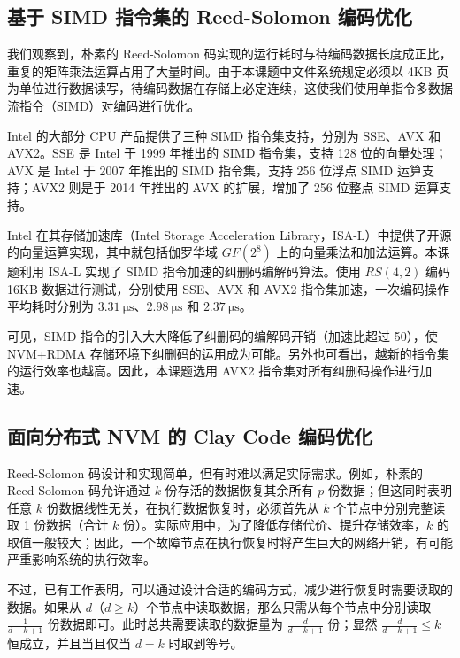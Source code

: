 \subsection{基于 SIMD 指令集的 Reed-Solomon 编码优化}
\label{subsec:ch3_rs_simd}

我们观察到，朴素的 Reed-Solomon 码实现的运行耗时与待编码数据长度成正比，重复的矩阵乘法运算占用了大量时间。由于本课题中文件系统规定必须以 4KB 页为单位进行数据读写，待编码数据在存储上必定连续，这使我们使用单指令多数据流指令（SIMD）对编码进行优化。

Intel 的大部分 CPU 产品提供了三种 SIMD 指令集支持，分别为 SSE、AVX 和 AVX2。SSE 是 Intel 于 1999 年推出的 SIMD 指令集，支持 128 位的向量处理；AVX 是 Intel 于 2007 年推出的 SIMD 指令集，支持 256 位浮点 SIMD 运算支持；AVX2 则是于 2014 年推出的 AVX 的扩展，增加了 256 位整点 SIMD 运算支持。

Intel 在其存储加速库（Intel Storage Acceleration Library，ISA-L）中提供了开源的向量运算实现，其中就包括伽罗华域 $GF(2^8)$ 上的向量乘法和加法运算。本课题利用 ISA-L 实现了 SIMD 指令加速的纠删码编解码算法。使用 $RS(4, 2)$ 编码 16KB 数据进行测试，分别使用 SSE、AVX 和 AVX2 指令集加速，一次编码操作平均耗时分别为 $\SI{3.31}{\us}$、$\SI{2.98}{\us}$ 和 $\SI{2.37}{\us}$。

可见，SIMD 指令的引入大大降低了纠删码的编解码开销（加速比超过 50），使 NVM+RDMA 存储环境下纠删码的运用成为可能。另外也可看出，越新的指令集的运行效率也越高。因此，本课题选用 AVX2 指令集对所有纠删码操作进行加速。

\subsection{面向分布式 NVM 的 Clay Code 编码优化}
\label{subsec:ch3_claycode}

Reed-Solomon 码设计和实现简单，但有时难以满足实际需求。例如，朴素的 Reed-Solomon 码允许通过 $k$ 份存活的数据恢复其余所有 $p$ 份数据；但这同时表明任意 $k$ 份数据线性无关，在执行数据恢复时，必须首先从 $k$ 个节点中分别完整读取 1 份数据（合计 $k$ 份）。实际应用中，为了降低存储代价、提升存储效率，$k$ 的取值一般较大；因此，一个故障节点在执行恢复时将产生巨大的网络开销，有可能严重影响系统的执行效率。

不过，已有工作\cite{dimakis2010}表明，可以通过设计合适的编码方式，减少进行恢复时需要读取的数据。如果从 $d$（$d \geq k$）个节点中读取数据，那么只需从每个节点中分别读取 $\frac{1}{d - k + 1}$ 份数据即可。此时总共需要读取的数据量为 $\frac{d}{d - k + 1}$ 份；显然 $\frac{d}{d - k + 1} \leq k$ 恒成立，并且当且仅当 $d = k$ 时取到等号。

